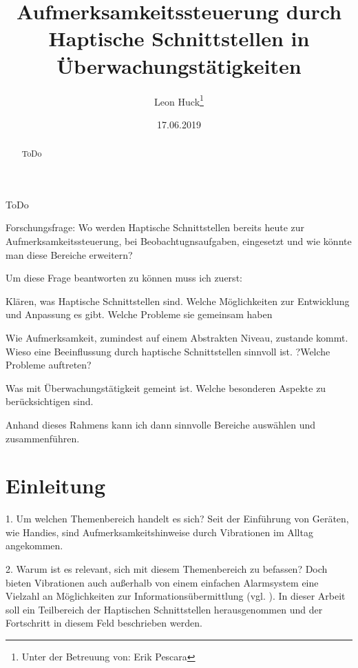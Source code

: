 \documentclass{llncs}					%
\title{Aufmerksamkeitssteuerung durch Haptische Schnittstellen in Überwachungstätigkeiten}
\author{Leon Huck\thanks{Unter der Betreuung von: Erik Pescara}}
\institute{Karlsruher Institut für Technologie}
\date{17.06.2019}
\begin{document}
	
\maketitle

\begin{description}
	\item ToDo
\end{description}

\begin{abstract}
	ToDo
\end{abstract}

\begin{flushleft}
	Forschungsfrage:
	Wo werden Haptische Schnittstellen bereits heute zur Aufmerksamkeitssteuerung, bei Beobachtugnsaufgaben, eingesetzt und wie könnte man diese Bereiche erweitern?
	
	Um diese Frage beantworten zu können muss ich zuerst:
	\item Klären, was Haptische Schnittstellen sind. Welche Möglichkeiten zur  Entwicklung und Anpassung es gibt. Welche Probleme sie gemeinsam haben
	\item Wie Aufmerksamkeit, zumindest auf einem Abstrakten Niveau, zustande kommt. Wieso eine Beeinflussung durch haptische Schnittstellen sinnvoll ist. ?Welche Probleme auftreten?
	\item Was mit Überwachungstätigkeit gemeint ist. Welche besonderen Aspekte zu berücksichtigen sind.
	\item Anhand dieses Rahmens kann ich dann sinnvolle Bereiche auswählen und zusammenführen.
\end{flushleft}
\newpage
\tableofcontents
\newpage

\newpage
\section{Einleitung}
1. Um welchen Themenbereich handelt es sich?
Seit der Einführung von Geräten, wie Handies, sind Aufmerksamkeitshinweise durch Vibrationen im Alltag angekommen.

2. Warum ist es relevant, sich mit diesem Themenbereich zu befassen?
Doch bieten Vibrationen auch außerhalb von einem einfachen Alarmsystem eine Vielzahl an Möglichkeiten zur Informationsübermittlung (vgl. \cite{10.2307/1705360}). In dieser Arbeit soll ein Teilbereich der Haptischen Schnittstellen herausgenommen und der Fortschritt in diesem Feld beschrieben werden.
\end{document}
